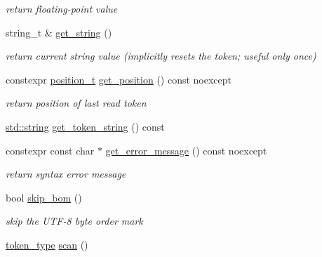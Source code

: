 \begin{DoxyCompactItemize}
\begin{DoxyCompactList}\small\item\em return floating-\/point value \end{DoxyCompactList}\item 
string\+\_\+t \& \mbox{\hyperlink{classnlohmann_1_1detail_1_1lexer_a54aa290ff2f60218a8f35f1ebf81666d}{get\+\_\+string}} ()
\begin{DoxyCompactList}\small\item\em return current string value (implicitly resets the token; useful only once) \end{DoxyCompactList}\item 
constexpr \mbox{\hyperlink{structnlohmann_1_1detail_1_1position__t}{position\+\_\+t}} \mbox{\hyperlink{classnlohmann_1_1detail_1_1lexer_abf5143501435f9f79898c1ff238c2622}{get\+\_\+position}} () const noexcept
\begin{DoxyCompactList}\small\item\em return position of last read token \end{DoxyCompactList}\item 
\mbox{\hyperlink{namespacenlohmann_1_1detail_a1ed8fc6239da25abcaf681d30ace4985ab45cffe084dd3d20d928bee85e7b0f21}{std\+::string}} \mbox{\hyperlink{classnlohmann_1_1detail_1_1lexer_a4aef7e72e539be04e139c34872421f2a}{get\+\_\+token\+\_\+string}} () const
\item 
constexpr const char $\ast$ \mbox{\hyperlink{classnlohmann_1_1detail_1_1lexer_a53cebbc684ef97fa49651eb442d58f86}{get\+\_\+error\+\_\+message}} () const noexcept
\begin{DoxyCompactList}\small\item\em return syntax error message \end{DoxyCompactList}\item 
bool \mbox{\hyperlink{classnlohmann_1_1detail_1_1lexer_a709afd52def2e258dac0b8a67dc4ea26}{skip\+\_\+bom}} ()
\begin{DoxyCompactList}\small\item\em skip the U\+T\+F-\/8 byte order mark \end{DoxyCompactList}\item 
\mbox{\hyperlink{classnlohmann_1_1detail_1_1lexer_a3f313cdbe187cababfc5e06f0b69b098}{token\+\_\+type}} \mbox{\hyperlink{classnlohmann_1_1detail_1_1lexer_aac3041cd2b9291e64fee38db422863c9}{scan}} ()
\end{DoxyCompactItemize}
